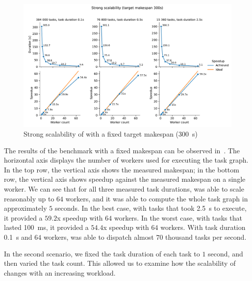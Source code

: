 \begin{figure}[h]
	\centering
	\includegraphics[width=\textwidth]{imgs/hq/charts/scalability-fixed-makespan}
	\caption{Strong scalability of \hyperqueue{} with a fixed target makespan (\SI{300}{\second})}
	\label{fig:hq-scalability-fixed-makespan}
\end{figure}

The results of the benchmark with a fixed makespan can be observed in~. The
horizontal axis displays the number of workers used for executing the task graph. In the top row,
the vertical axis shows the measured makespan; in the bottom row, the vertical axis shows speedup
against the measured makespan on a single worker. We can see that for all three measured task
durations, \hyperqueue{} was able to scale reasonably up to $64$
workers, and it was able to compute the whole task graph in approximately $5$
seconds. In the best case, with tasks that took \SI{2.5}{\second} to execute, it provided a
$59.2$x speedup with $64$ workers. In the worst case, with tasks
that lasted \SI{100}{\milli\second}, it provided a $54.4$x speedup with
$64$ workers. With task duration \SI{0.1}{\second} and
$64$ workers, \hyperqueue{} was able to dispatch almost
$70$ thousand tasks per second.

In the second scenario, we fixed the task duration of each task to $1$ second,
and then varied the task count. This allowed us to examine how the scalability of
\hyperqueue{} changes with an increasing workload.

